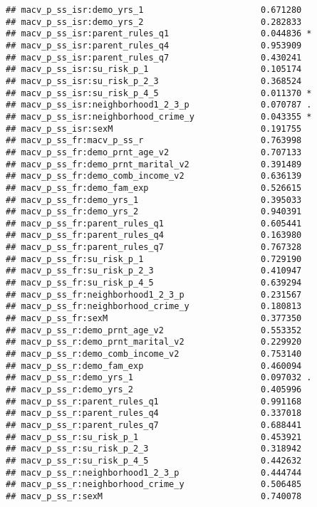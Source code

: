 \documentclass[
]{article}
\begin{document}
\begin{verbatim}
## macv_p_ss_isr:demo_yrs_1                       0.671280    
## macv_p_ss_isr:demo_yrs_2                       0.282833    
## macv_p_ss_isr:parent_rules_q1                  0.044836 *  
## macv_p_ss_isr:parent_rules_q4                  0.953909    
## macv_p_ss_isr:parent_rules_q7                  0.430241    
## macv_p_ss_isr:su_risk_p_1                      0.105174    
## macv_p_ss_isr:su_risk_p_2_3                    0.368524    
## macv_p_ss_isr:su_risk_p_4_5                    0.011370 *  
## macv_p_ss_isr:neighborhood1_2_3_p              0.070787 .  
## macv_p_ss_isr:neighborhood_crime_y             0.043355 *  
## macv_p_ss_isr:sexM                             0.191755    
## macv_p_ss_fr:macv_p_ss_r                       0.763998    
## macv_p_ss_fr:demo_prnt_age_v2                  0.707133    
## macv_p_ss_fr:demo_prnt_marital_v2              0.391489    
## macv_p_ss_fr:demo_comb_income_v2               0.636139    
## macv_p_ss_fr:demo_fam_exp                      0.526615    
## macv_p_ss_fr:demo_yrs_1                        0.395033    
## macv_p_ss_fr:demo_yrs_2                        0.940391    
## macv_p_ss_fr:parent_rules_q1                   0.605441    
## macv_p_ss_fr:parent_rules_q4                   0.163980    
## macv_p_ss_fr:parent_rules_q7                   0.767328    
## macv_p_ss_fr:su_risk_p_1                       0.729190    
## macv_p_ss_fr:su_risk_p_2_3                     0.410947    
## macv_p_ss_fr:su_risk_p_4_5                     0.639294    
## macv_p_ss_fr:neighborhood1_2_3_p               0.231567    
## macv_p_ss_fr:neighborhood_crime_y              0.180813    
## macv_p_ss_fr:sexM                              0.377350    
## macv_p_ss_r:demo_prnt_age_v2                   0.553352    
## macv_p_ss_r:demo_prnt_marital_v2               0.229920    
## macv_p_ss_r:demo_comb_income_v2                0.753140    
## macv_p_ss_r:demo_fam_exp                       0.460094    
## macv_p_ss_r:demo_yrs_1                         0.097032 .  
## macv_p_ss_r:demo_yrs_2                         0.405996    
## macv_p_ss_r:parent_rules_q1                    0.991168    
## macv_p_ss_r:parent_rules_q4                    0.337018    
## macv_p_ss_r:parent_rules_q7                    0.688441    
## macv_p_ss_r:su_risk_p_1                        0.453921    
## macv_p_ss_r:su_risk_p_2_3                      0.318942    
## macv_p_ss_r:su_risk_p_4_5                      0.442632    
## macv_p_ss_r:neighborhood1_2_3_p                0.444744    
## macv_p_ss_r:neighborhood_crime_y               0.506485    
## macv_p_ss_r:sexM                               0.740078    

\end{verbatim}
\end{document}
